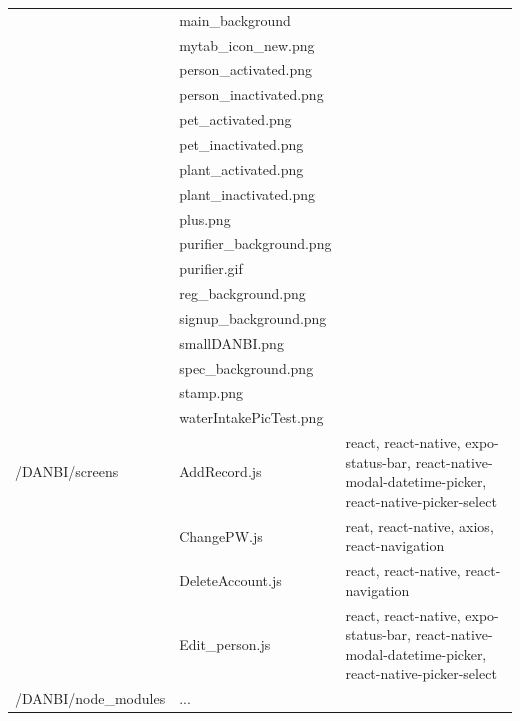 \documentclass[conference]{IEEEtran}
\begin{document}
\begin{table}[h!]
\begin{threeparttable}
\begin{tabular}{p{2.4cm}p{2.8cm}p{2cm}}
            & main\_background\\
            & mytab\_icon\_new.png\\
            & person\_activated.png\\
            & person\_inactivated.png\\
            & pet\_activated.png\\
            & pet\_inactivated.png\\
            & plant\_activated.png\\
            & plant\_inactivated.png\\
            & plus.png\\
            & purifier\_background.png\\
            & purifier.gif\\
            & reg\_background.png\\
            & signup\_background.png\\
            & smallDANBI.png\\
            & spec\_background.png\\
            & stamp.png\\
            & waterIntakePicTest.png\\
            \hline
            /DANBI/screens
            & AddRecord.js& react, react-native, expo-status-bar, react-native-modal-datetime-picker, react-native-picker-select\\
            & ChangePW.js& reat, react-native, axios, react-navigation\\
            & DeleteAccount.js& react, react-native, react-navigation\\
            & Edit\_person.js& react, react-native, expo-status-bar, react-native-modal-datetime-picker, react-native-picker-select\\
        \hline
        /DANBI/node\_modules& ...\\  
            \bottomrule
            \end{tabular}
        \end{threeparttable}
    \end{table}
    
\end{document}
